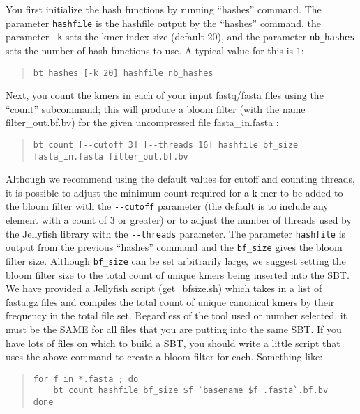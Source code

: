 \documentclass{article}
\begin{document}
You first initialize the hash functions by running ``hashes'' command. The parameter \verb+hashfile+ is the hashfile output by the ``hashes'' command, the parameter \verb+-k+ sets the kmer index size (default 20), and the parameter \verb+nb_hashes+ sets the number of hash functions to use. A typical value for this is $1$:
%
\begin{quote}
\begin{verbatim}
bt hashes [-k 20] hashfile nb_hashes
\end{verbatim}
\end{quote}

Next, you count the kmers in each of your input fastq/fasta files using the ``count'' subcommand; this will produce a bloom filter (with the name filter\_out.bf.bv) for the given uncompressed file fasta\_in.fasta :
%
\begin{quote}
\begin{verbatim}
bt count [--cutoff 3] [--threads 16] hashfile bf_size fasta_in.fasta filter_out.bf.bv
\end{verbatim}
\end{quote}
%
Although we recommend using the default values for cutoff and counting threads, it is possible to adjust the minimum count required for a k-mer to be added to the bloom filter with the \verb+--cutoff+ parameter (the default is to include any element with a count of 3 or greater) or to adjust the number of threads used by the Jellyfish library with the \verb+--threads+ parameter. The parameter \verb+hashfile+ is output from the previous ``hashes'' command and the \verb+bf_size+ gives the bloom filter size. Although \verb+bf_size+ can be set arbitrarily large, we suggest setting the bloom filter size to the total count of unique kmers being inserted into the SBT. We have provided a Jellyfish script (get\_bfsize.sh) which takes in a list of fasta.gz files and compiles the total count of unique canonical kmers by their frequency in the total file set. Regardless of the tool used or number selected, it must be the SAME for all files that you are putting into the same SBT. If you have lots of files on which to build a SBT, you should write a little script that uses the above command to create a bloom filter for each. Something like:
%
\begin{quote}
\begin{verbatim}
for f in *.fasta ; do 
    bt count hashfile bf_size $f `basename $f .fasta`.bf.bv
done
\end{verbatim}
\end{quote}
\end{document}
